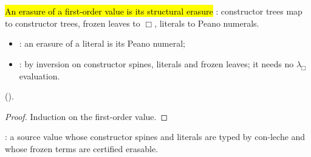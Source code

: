 \begin{lemma}
  \label{lem:EraseProof-FirstOrder-Erases-firstOrder}
  \leanok
   \hl{An erasure of a first-order value is its structural erasure }: constructor trees map to constructor trees, frozen leaves to $\Box$, literals to Peano numerals.
  \begin{itemize}
  \item {}: an erasure of a  literal is its Peano numeral;
  \item {}: by inversion on constructor spines, literals and frozen leaves; it needs no $\lambda_\Box$ evaluation.
  \end{itemize}
    ().
\end{lemma}
\begin{proof}
  \leanok
   Induction on the first-order value.
\end{proof}

\begin{definition}
  \label{def:EraseProof-FirstOrder-CertValue}
  \leanok
   : a source value whose constructor spines and literals are typed by con-leche and whose frozen terms are certified erasable.
\end{definition}

